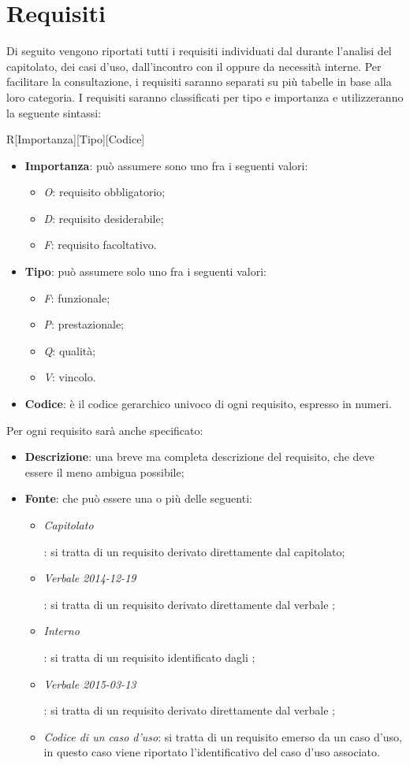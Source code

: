 \section{Requisiti}
\label{tabellona}
Di seguito vengono riportati tutti i requisiti individuati dal  durante l'analisi del capitolato, dei casi d'uso, dall'incontro con il  oppure da necessità interne.
Per facilitare la consultazione, i requisiti saranno separati su più tabelle in base alla loro categoria.
I requisiti saranno classificati per tipo e importanza e utilizzeranno la seguente sintassi:
\begin{center}
R[Importanza][Tipo][Codice]
\end{center}
\begin{itemize}
\item \textbf{Importanza}: può assumere sono uno fra i seguenti valori:
\begin{itemize}
\item \textit{O}: requisito obbligatorio;
\item \textit{D}: requisito desiderabile;
\item \textit{F}: requisito facoltativo.
\end{itemize}
\item \textbf{Tipo}: può assumere solo uno fra i seguenti valori:
\begin{itemize}
\item \textit{F}: funzionale;
\item \textit{P}: prestazionale;
\item \textit{Q}: qualità;
\item \textit{V}: vincolo.
\end{itemize}
\item \textbf{Codice}: è il codice gerarchico univoco di ogni requisito, espresso in numeri.
\end{itemize}
\noindent Per ogni requisito sarà anche specificato:
\begin{itemize}
\item \textbf{Descrizione}: una breve ma completa descrizione del requisito, che deve essere il meno ambigua possibile;
\item \textbf{Fonte}: che può essere una o più delle seguenti:
\begin{itemize}
\item \hypertarget{Capitolato}{\textit{Capitolato}}: si tratta di un requisito derivato direttamente dal capitolato;
\item \hypertarget{Verbale 2014-12-19}{\textit{Verbale 2014-12-19}}: si tratta di un requisito derivato direttamente dal verbale \iI;
\item \hypertarget{Interno}{\textit{Interno}}: si tratta di un requisito identificato dagli \rAs;
\item \hypertarget{Verbale 2015-03-13}{\textit{Verbale 2015-03-13}}: si tratta di un requisito derivato direttamente dal verbale \iII;
\item \textit{Codice di un caso d'uso}: si tratta di un requisito emerso da un caso d'uso, in questo caso viene riportato l'identificativo del caso d'uso associato.
\end{itemize}
\end{itemize}
